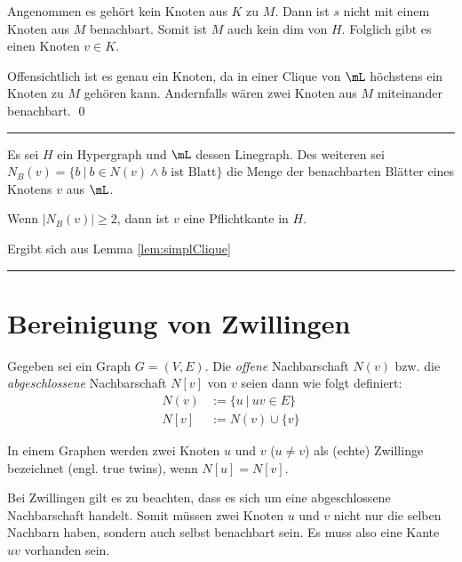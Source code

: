 \begin{Proof}
Angenommen es gehört kein Knoten aus $K$ zu $M$. Dann ist $s$ nicht mit einem Knoten aus $M$ benachbart. Somit ist $M$ auch kein dim von $H$. Folglich gibt es einen Knoten $v\in K$.

Offensichtlich ist es genau ein Knoten, da in einer Clique von $\mL$ höchstens ein Knoten zu $M$ gehören kann. Andernfalls wären zwei Knoten aus $M$ miteinander benachbart.
\qed
\end{Proof}

\rule{\linewidth}{1pt}
\clearpage

\begin{Lemma}
Es sei $H$ ein Hypergraph und $\mL$ dessen Linegraph. Des weiteren sei $N_B(v)=\{b\ |\ b\in N(v)\wedge b\text{ ist Blatt}\}$ die Menge der benachbarten Blätter eines Knotens $v$ aus $\mL$.

Wenn $\left|N_B(v)\right|\geq2$, dann ist $v$ eine Pflichtkante in $H$.
\end{Lemma}

Ergibt sich aus Lemma \ref{lem:simplClique}

\rule{\linewidth}{1pt}
\clearpage

\section{Bereinigung von Zwillingen}

\begin{mydef}
    Gegeben sei ein Graph $G=(V,E)$. Die \emph{offene} Nachbarschaft $N(v)$ bzw. die \emph{abgeschlossene} Nachbarschaft $N[v]$ von $v$ seien dann wie folgt definiert:
    \begin{align*}
        N(v)&:=\{u\ |\ uv \in E\} \\
        N[v]&:=N(v) \cup \{v\}
    \end{align*}
\end{mydef}

\begin{mydef}[Zwillinge]
    In einem Graphen werden zwei Knoten $u$ und $v$ ($u\neq v$) als (echte) Zwillinge bezeichnet (engl. true twins), wenn $N[u]=N[v]$.
\end{mydef}

Bei Zwillingen gilt es zu beachten, dass es sich um eine abgeschlossene Nachbarschaft handelt. Somit müssen zwei Knoten $u$ und $v$ nicht nur die selben Nachbarn haben, sondern auch selbst benachbart sein. Es muss also eine Kante $uv$ vorhanden sein.

